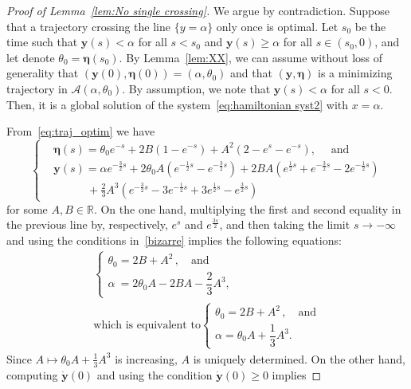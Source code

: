 \documentclass[AHL,Unicode,longabstracts]{cedram}
\newcommand{\R}{\mathbb{R}}
\newcommand{\by}{\mathbf{y}}
\newcommand{\bA}{\mathscr{A}}
\newcommand{\beeta}{\boldsymbol{\eta}}
\newcommand{\1}{\mathds{1}}
\begin{document}
\begin{proof}[Proof of Lemma~\ref{lem:No single crossing}]
We argue by contradiction. Suppose that a trajectory crossing the line $\{y = \alpha\}$ only once is optimal. Let $s_0$ be the time such that $\by(s) < \alpha$ for all $s < s_0$ and $\by(s) \geq \alpha$ for all $s\in(s_0,0)$, and let denote $\theta_0 = \beeta(s_0)$. By Lemma~\ref{lem:XX}, we can assume without loss of generality that $(\by(0),\beeta(0)) = (\alpha,\theta_0)$ and that $(\by,\beeta)$ is a minimizing trajectory in $\bA(\alpha,\theta_0)$. By assumption, we note that $\by(s) < \alpha$ for all $s < 0$. Then, it is a global solution of the system~\eqref{eq:hamiltonian syst2} with $x = \alpha$.

From~\eqref{eq:traj_optim} we have
\begin{equation*}
\begin{cases}
&\beeta(s) = \theta_0 e^{-s} + 2 B \left(1 - e^{-s}\right) + A ^2 \left(2 - e^{s} - e^{-s}\right), \quad\text{ and}
\\[0.10em]
&\by(s) = \alpha e^{-\frac32s} + 2 \theta_0 A \left(e^{-\frac12 s } - e^{-\frac32s}\right) + 2 B A \left(e^{\frac12 s } + e^{-\frac32s} - 2 e^{-\frac12s} \right)
\\[0.10em]
&\displaystyle\qquad\quad + \frac23 A^3 \left(e^{-\frac32s} - 3e^{-\frac12s} + 3e^{\frac12s} - e^{\frac32s} \right)
\end{cases}
\end{equation*}
for some $A, B \in \R$. On the one hand, multiplying the first and second equality in the previous line by, respectively, $e^{s}$ and $e^{\frac{3s}{2}}$, and then taking the limit $s\rightarrow -\infty$ and using the conditions in~\eqref{bizarre} implies the following equations:
\begin{multline}\label{eq:condition at oo lem 3.2}
\begin{cases}
\theta_0 = 2B + A^2\,, \quad \text{and}
\\[0.10em]
\alpha \:= 2\theta_0 A - 2BA - \dfrac23A^3,
\end{cases} \\
\text{which is equivalent to}
\begin{cases}
\theta_0 = 2B + A^2\,, \quad \text{and}
\\[0.10em]
\alpha = \theta_0 A+ \dfrac13A^3.
\end{cases}
\end{multline}
Since $A\mapsto \theta_0 A+ \frac13A^3$ is increasing, $A$ is uniquely determined. On the other hand, computing $\dot{\by}(0)$ and using the condition $\dot{\by} (0)\geq 0$ implies

\end{proof}
\end{document}
